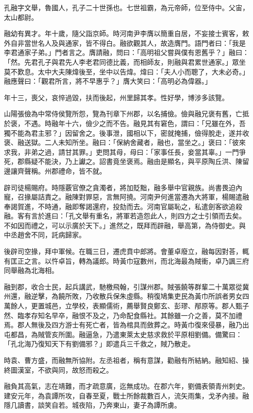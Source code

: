 \begin{pinyinscope}
孔融字文舉，魯國人，孔子二十世孫也。七世祖霸，為元帝師，位至侍中。父宙，太山都尉。

融幼有異才。年十歲，隨父詣京師。時河南尹李膺以簡重自居，不妄接士賓客，敕外自非當世名人及與通家，皆不得白。融欲觀其人，故造膺門。語門者曰：「我是李君通家子弟。」門者言之。膺請融，問曰：「高明祖父嘗與僕有恩舊乎？」融曰：「然。先君孔子與君先人李老君同德比義，而相師友，則融與君累世通家。」眾坐莫不歎息。太中大夫陳煒後至，坐中以告煒。煒曰：「夫人小而聰了，大未必奇。」融應聲曰：「觀君所言，將不早惠乎？」膺大笑曰：「高明必為偉器。」

年十三，喪父，哀悴過毀，扶而後起，州里歸其孝。性好學，博涉多該覽。

山陽張儉為中常侍侯覽所怨，覽為刊章下州郡，以名捕儉。儉與融兄褒有舊，亡抵於褒，不遇。時融年十六，儉少之而不告。融見其有窘色，謂曰：「兄雖在外，吾獨不能為君主邪？」因留舍之。後事泄，國相以下，密就掩捕，儉得脫走，遂并收褒、融送獄。二人未知所坐。融曰：「保納舍藏者，融也，當坐之。」褒曰：「彼來求我，非弟之過，請甘其罪。」吏問其母，母曰：「家事任長，妾當其辜。」一門爭死，郡縣疑不能決，乃上讞之。詔書竟坐褒焉。融由是顯名，與平原陶丘洪、陳留邊讓齊聲稱。州郡禮命，皆不就。

辟司徒楊賜府。時隱覈官僚之貪濁者，將加貶黜，融多舉中官親族。尚書畏迫內寵，召掾屬詰責之。融陳對罪惡，言無阿撓。河南尹何進當遷為大將軍，楊賜遣融奉謁賀進，不時通，融即奪謁還府，投劾而去。河南官屬恥之，私遣劍客欲追殺融。客有言於進曰：「孔文舉有重名，將軍若造怨此人，則四方之士引領而去矣。不如因而禮之，可以示廣於天下。」進然之，既拜而辟融，舉高第，為侍御史。與中丞趙舍不同，託病歸家。

後辟司空掾，拜中軍候。在職三日，遷虎賁中郎將。會董卓廢立，融每因對荅，輒有匡正之言。以忤卓旨，轉為議郎。時黃巾寇數州，而北海最為賊衝，卓乃諷三府同舉融為北海相。

融到郡，收合士民，起兵講武，馳檄飛翰，引謀州郡。賊張饒等群輩二十萬眾從冀州還，融逆擊，為饒所敗，乃收散兵保朱虛縣。稍復鳩集吏民為黃巾所誤者男女四萬餘人，更置城邑，立學校，表顯儒術，薦舉賢良鄭玄、彭璆、邴原等。郡人甄子然、臨孝存知名早卒，融恨不及之，乃命配食縣社。其餘雖一介之善，莫不加禮焉。郡人無後及四方游士有死亡者，皆為棺具而斂葬之。時黃巾復來侵暴，融乃出屯都昌，為賊管亥所圍。融逼急，乃遣東萊太史慈求救於平原相劉備。備驚曰：「孔北海乃復知天下有劉備邪？」即遣兵三千救之，賊乃散走。

時袁、曹方盛，而融無所協附。左丞祖者，稱有意謀，勸融有所結納。融知紹、操終圖漢室，不欲與同，故怒而殺之。

融負其高氣，志在靖難，而才疏意廣，迄無成功。在郡六年，劉備表領青州刺史。建安元年，為袁譚所攻，自春至夏，戰士所餘裁數百人，流矢雨集，戈矛內接。融隱几讀書，談笑自若。城夜陷，乃奔東山，妻子為譚所虜。


\end{pinyinscope}
